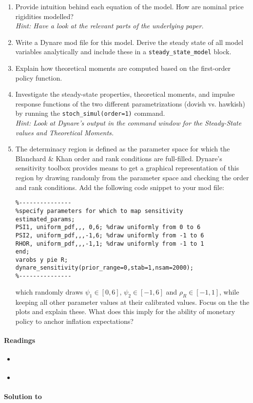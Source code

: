 \begin{enumerate}

\item Provide intuition behind each equation of the model.
How are nominal price rigidities modelled?\\\emph{Hint: Have a look at the relevant parts of the underlying paper.}

\item Write a Dynare mod file for this model. Derive the steady state of all model variables analytically and include these in a \texttt{steady\_state\_model} block.

\item Explain how theoretical moments are computed based on the first-order policy function.

\item Investigate the steady-state properties, theoretical moments, and impulse response functions of the two different parametrizations (dovish vs. hawkish) 
  by running the \texttt{stoch\_simul(order=1)} command.
\\
\emph{Hint: Look at Dynare's output in the command window for the Steady-State values and Theoretical Moments.}

\item The determinacy region is defined as the parameter space for which the Blanchard \& Khan order and rank conditions are full-filled.
Dynare's sensitivity toolbox provides means to get a graphical representation of this region
  by drawing randomly from the parameter space and checking the order and rank conditions.
Add the following code snippet to your mod file:
\begin{verbatim}
%---------------
%specify parameters for which to map sensitivity
estimated_params;
PSI1, uniform_pdf,,, 0,6; %draw uniformly from 0 to 6
PSI2, uniform_pdf,,,-1,6; %draw uniformly from -1 to 6
RHOR, uniform_pdf,,,-1,1; %draw uniformly from -1 to 1
end;
varobs y pie R;
dynare_sensitivity(prior_range=0,stab=1,nsam=2000);		
%---------------
\end{verbatim}	
  which randomly draws $\psi_1 \in [0,6]$, $\psi_2 \in [-1,6]$ and $\rho_R \in [-1,1]$,
  while keeping all other parameter values at their calibrated values.
Focus on the the plots and explain these.
What does this imply for the ability of monetary policy to anchor inflation expectations?
\end{enumerate}

\paragraph{Readings}
\begin{itemize}
	\item \textcite{An.Schorfheide_2007_BayesianAnalysisDSGE}
	\item \textcite{Ivashchenko.Mutschler_2020_EffectObservablesFunctionala}
\end{itemize}

\begin{solution}\textbf{Solution to }
\ifDisplaySolutions

\fi
\newpage
\end{solution}